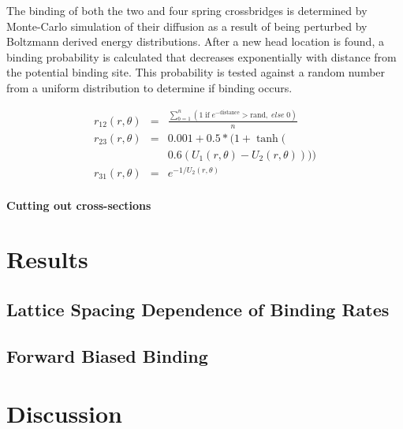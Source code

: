 \documentclass[]{article}
\begin{document}
The binding of both the two and four spring crossbridges is determined by Monte-Carlo simulation of their diffusion as a result of being perturbed by Boltzmann derived energy distributions. 
After a new head location is found, a binding probability is calculated that decreases exponentially with distance from the potential binding site. 
This probability is tested against a random number from a uniform distribution to determine if binding occurs.


\begin{eqnarray}  
\label{eq:KineticRates}
	r_{12}(r, \theta)   & = & \frac{\sum_{b=1}^n (1\; \textrm{if}\; e^{-\textrm{distance}}>\textrm{rand} ,\; else\; 0)}{n}  \nonumber \\
    r_{23}(r, \theta)   & = & 0.001 + 0.5 * (1 + \tanh( \nonumber \\
                        &   & 0.6 (U_1(r, \theta) - U_2(r, \theta)))) \\
	r_{31}(r, \theta)   & = & e^{-1 / U_2(r, \theta)}
\end{eqnarray} 

\paragraph*{Cutting out cross-sections}





\section*{Results}

\subsection*{Lattice Spacing Dependence of Binding Rates}



\subsection*{Forward Biased Binding}


\section*{Discussion}

\subsection*{}
\end{document}
